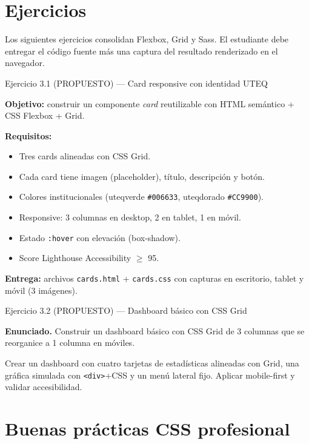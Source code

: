 \section{Ejercicios}

Los siguientes ejercicios consolidan Flexbox, Grid y Sass.
El estudiante debe entregar el código fuente más una captura del
resultado renderizado en el navegador.


\begin{cajaejercicio}{Ejercicio 3.1 (PROPUESTO) --- Card responsive con identidad UTEQ}

\textbf{Objetivo:} construir un componente \emph{card} reutilizable
con HTML semántico + CSS Flexbox + Grid.

\textbf{Requisitos:}
\begin{itemize}
\item Tres cards alineadas con CSS Grid.
\item Cada card tiene imagen (placeholder), título, descripción y
botón.
\item Colores institucionales (uteqverde \texttt{\#006633}, uteqdorado
\texttt{\#CC9900}).
\item Responsive: 3 columnas en desktop, 2 en tablet, 1 en móvil.
\item Estado \texttt{:hover} con elevación (box-shadow).
\item Score Lighthouse Accessibility $\geq$ 95.
\end{itemize}

\textbf{Entrega:} archivos \texttt{cards.html} + \texttt{cards.css}
con capturas en escritorio, tablet y móvil (3 imágenes).
\end{cajaejercicio}

\begin{cajaejercicio}{Ejercicio 3.2 (PROPUESTO) --- Dashboard básico con CSS Grid}


\textbf{Enunciado.} Construir un dashboard básico con CSS Grid de 3 columnas que se reorganice a 1 columna en móviles.

Crear un dashboard con cuatro tarjetas de estadísticas alineadas
con Grid, una gráfica simulada con \texttt{<div>}+CSS y un menú
lateral fijo. Aplicar mobile-first y validar accesibilidad.
\end{cajaejercicio}

\section{Buenas prácticas CSS profesional}

